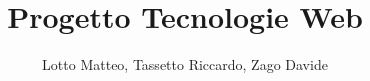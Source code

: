 \documentclass[a4paper,12pt]{article}
\begin{document}
\title{Progetto Tecnologie Web}
\author{Lotto Matteo, Tassetto Riccardo, Zago Davide}
\date{}
\maketitle
\tableofcontents








\end{document}
